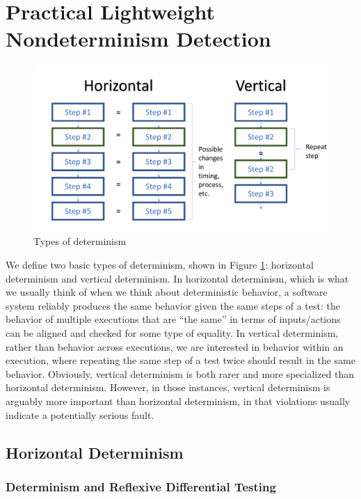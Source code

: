 \section{Practical Lightweight Nondeterminism
  Detection}

\begin{figure}
\includegraphics[width=\columnwidth]{types}
\caption{Types of determinism}
\label{fig:types}
\end{figure}

We define two basic types of determinism, shown in Figure
\ref{fig:types}:  horizontal determinism and vertical determinism.  In
horizontal determinism, which is what we usually think of when we
think about deterministic behavior, a software system reliably
produces the same behavior given the same steps of a test: the
behavior of multiple executions that are ``the same'' in terms of
inputs/actions can be aligned and checked for some type of equality.  In
vertical determinism, rather than behavior across executions, we are
interested in behavior within an execution, where repeating the same
step of a test twice should result in the same behavior.  Obviously,
vertical determinism is both rarer and more specialized than
horizontal determinism.  However, in those instances, vertical
determinism is arguably more important than horizontal determinism, in
that violations usually indicate a potentially serious fault.

\subsection{Horizontal Determinism}


\subsubsection{Determinism and Reflexive Differential Testing}

